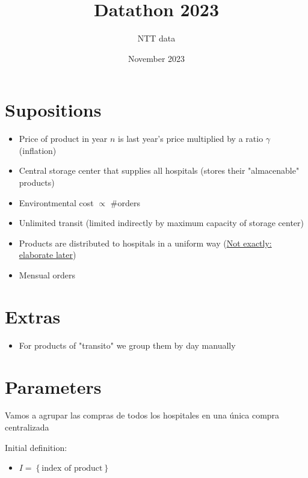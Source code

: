 \documentclass[a4paper]{article}
\title{Datathon 2023}
\author{NTT data}
\date{November 2023}
\theoremstyle{definition}
\begin{document}
\maketitle

\newpage
\tableofcontents


\newpage
\section{Supositions}
\begin{itemize}
	\item Price of product in year $n$ is last year's price multiplied by a ratio  $\gamma$ (inflation)
	\item Central storage center that supplies all hospitals (stores their "almacenable" products)
	\item Environtmental cost \quad $\propto$ \quad $\#$orders
	\item Unlimited transit (limited indirectly by  maximum capacity of storage center) 
	\item Products are distributed to hospitals in a uniform way (\underline{Not exactly: elaborate later})
	\item Mensual orders
\end{itemize}

\section{Extras}
\begin{itemize}
	\item For products of "transito" we group them by day manually
\end{itemize}



\newpage
\section{Parameters}

\begin{note}
Vamos a agrupar las compras de todos los hospitales en una única compra centralizada
\end{note}

\vspace{5mm}

Initial definition:
\begin{itemize}
	\item $I = \left\{ \text{index of product} \right\} $ 
\end{itemize}
\end{document}
